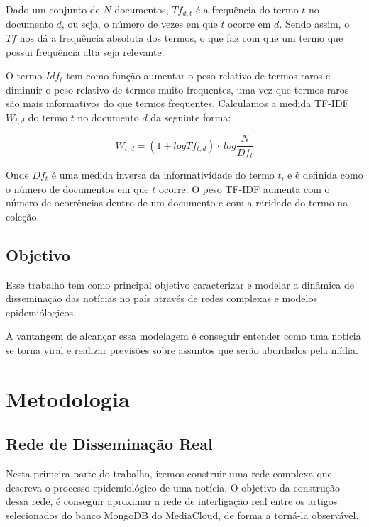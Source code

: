 \documentclass[a4paper,12pt]{article}
\begin{document}
\begin{description}
  Dado um conjunto de $N$ documentos, $Tf_{d,t}$ é a frequência do termo $t$ no documento
  $d$, ou seja, o número de vezes em que $t$ ocorre em $d$. Sendo assim, o $Tf$ nos dá a frequência absoluta dos termos, 
  o que faz com que um termo que possui frequência alta seja relevante.
  
  O termo $Idf_{t}$ tem como função aumentar o peso relativo de termos raros e diminuir o peso relativo de termos muito frequentes,
  uma vez que termos raros são mais informativos do que termos frequentes. Calculamos a medida TF-IDF $ W_{t,d}$ do termo $t$ no documento
  $d$ da seguinte forma:

  \begin{equation}
    W_{t,d} = (1 + log Tf_{t,d}) \cdot \ log \dfrac{N}{Df_{t}}
  \end{equation}


  Onde $Df_{t}$ é uma medida inversa da informatividade do termo $t$, e é definida como o número de documentos em que $t$ ocorre. O peso
  TF-IDF aumenta com o número de ocorrências dentro de um documento e com a raridade do termo na coleção.
\end{description}

\subsection{Objetivo}

Esse trabalho tem como principal objetivo caracterizar e modelar a dinâmica de disseminação das notícias no país através de redes 
complexas e modelos epidemiólogicos.

A vantangem de alcançar essa modelagem é conseguir entender como uma notícia se torna viral e realizar previsões sobre assuntos
que serão abordados pela mídia.




\pagebreak
\section{Metodologia}

\subsection{Rede de Disseminação Real}

Nesta primeira parte do trabalho, iremos construir uma rede complexa que descreva o processo epidemiológico de uma notícia. O objetivo
da construção dessa rede, é conseguir aproximar a rede de interligação real entre os artigos selecionados do banco MongoDB do 
MediaCloud, de forma a torná-la observável.
\end{document}
